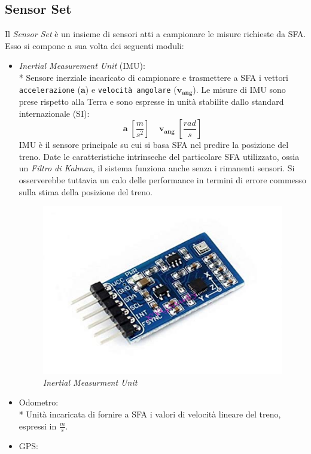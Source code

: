 \subsection{Sensor Set}
Il \emph{Sensor Set} \`e un insieme di sensori atti a campionare le misure richieste da SFA. Esso si compone a sua volta dei seguenti moduli:
\begin{itemize}
	\item \emph{Inertial Measurement Unit} (IMU):\\*
		Sensore inerziale incaricato di campionare e trasmettere a SFA i vettori \texttt{accelerazione} ($\mathbf{a}$) e \texttt{velocit\`a angolare} ($\mathbf{v_{ang}}$). Le misure di IMU sono prese rispetto alla Terra e sono espresse in unit\`a stabilite dallo standard internazionale (SI):
		$$
		\mathbf{a}\;\left[\frac{m}{s^2}\right]\;\;\;\;\mathbf{v_{ang}}\;\left[ \frac{rad}{s} \right]
		$$
		IMU \`e il sensore principale su cui si basa SFA nel predire la posizione del treno. Date le caratteristiche intrinseche del particolare SFA utilizzato, ossia un \emph{Filtro di Kalman}, il sistema funziona anche senza i rimanenti sensori. Si osserverebbe tuttavia un calo delle performance in termini di errore commesso sulla stima della posizione del treno. \cite{partialmeas} \cite{gpsdarkarea}
		\begin{figure}[h]
			\centering
			\includegraphics[scale=0.5]{img/imu}
			\caption{\emph{Inertial Measurment Unit}}
			\label{fig:imu}
		\end{figure}
		\item Odometro:\\*
		Unit\`a incaricata di fornire a SFA i valori di velocit\`a lineare del treno, espressi in $\frac{m}{s}$.
		\item GPS:

\end{itemize}
